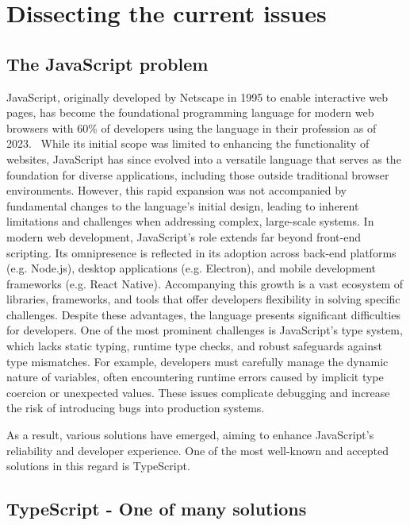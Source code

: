 \section{Dissecting the current issues}

\subsection{The JavaScript problem}

JavaScript, originally developed by Netscape in 1995 to enable interactive web pages, has become the foundational programming language for modern web browsers with 60\% of developers using the language in their profession as of 2023.~\cite{jetbrains2023} While its initial scope was limited to enhancing the functionality of websites, JavaScript has since evolved into a versatile language that serves as the foundation for diverse applications, including those outside traditional browser environments. However, this rapid expansion was not accompanied by fundamental changes to the language's initial design, leading to inherent limitations and challenges when addressing complex, large-scale systems. In modern web development, JavaScript's role extends far beyond front-end scripting. Its omnipresence is reflected in its adoption across back-end platforms (e.g. Node.js), desktop applications (e.g. Electron), and mobile development frameworks (e.g. React Native). Accompanying this growth is a vast ecosystem of libraries, frameworks, and tools that offer developers flexibility in solving specific challenges. Despite these advantages, the language presents significant difficulties for developers. One of the most prominent challenges is JavaScript’s type system, which lacks static typing, runtime type checks, and robust safeguards against type mismatches. For example, developers must carefully manage the dynamic nature of variables, often encountering runtime errors caused by implicit type coercion or unexpected values. These issues complicate debugging and increase the risk of introducing bugs into production systems.

As a result, various solutions have emerged, aiming to enhance JavaScript's reliability and developer experience. One of the most well-known and accepted solutions in this regard is TypeScript.

\subsection{TypeScript - One of many solutions}

